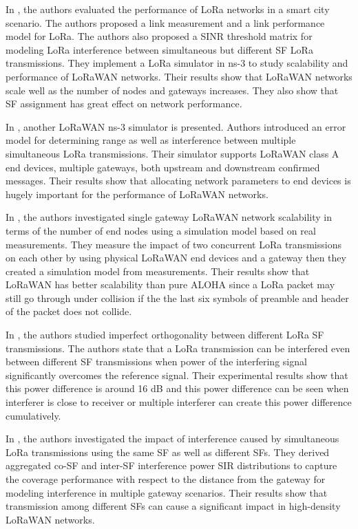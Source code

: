 \documentclass[conference]{IEEEtran}
\begin{document}
\par In \cite{7996384}, the authors evaluated the performance of LoRa networks in a smart city scenario. The
authors proposed a link measurement and a link performance model for LoRa. The authors also proposed a SINR threshold matrix for modeling LoRa interference between simultaneous but different SF LoRa transmissions. They implement a LoRa simulator in ns-3 to study scalability and performance of LoRaWAN networks. Their results show that LoRaWAN networks scale well as the number of nodes and gateways increases. They also show that SF assignment has great effect on network performance.

\par In \cite{8090518}, another LoRaWAN ns-3 simulator is presented. Authors introduced an error model for determining range as well as interference between multiple simultaneous LoRa transmissions. Their simulator supports LoRaWAN class A end devices, multiple gateways, both upstream and downstream confirmed messages. Their results show that allocating network parameters to end devices is hugely important for the performance of LoRaWAN networks.

\par In \cite{s17061193}, the authors investigated single gateway LoRaWAN network scalability in terms of the number of end nodes using a simulation model based on real measurements. They measure the impact of two concurrent LoRa transmissions on each other by using physical LoRaWAN end devices and a gateway then they created a simulation model from measurements. Their results show that LoRaWAN has better scalability than pure ALOHA since a LoRa packet may still go through under collision if the the last six symbols of preamble and header of the packet does not collide.

\par In \cite{8267219}, the authors studied imperfect orthogonality between different LoRa SF transmissions. The authors state that a LoRa transmission can be interfered even between different SF transmissions when power of the interfering signal significantly overcomes the reference signal. Their experimental results show that this power difference is around 16 dB and this power difference can be seen when  interferer is close to receiver or multiple interferer can create this power difference cumulatively. 

\par In \cite{8430542}, the authors investigated the impact of interference caused by simultaneous LoRa transmissions using the same SF as well as different SFs. They derived aggregated co-SF and inter-SF interference power SIR distributions to capture the coverage performance with respect to the distance from the gateway for modeling interference in multiple gateway scenarios. Their results show that transmission among different SFs can cause a significant impact in high-density LoRaWAN networks.
\end{document}
